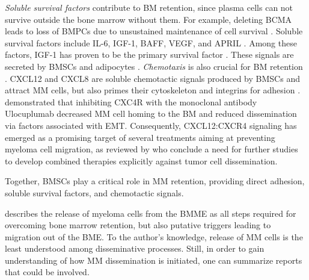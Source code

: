 \emph{Soluble survival factors} contribute to \ac{BM} retention, since plasma
cells can not survive outside the bone marrow without them. For example,
deleting BCMA  leads to loss of
\acp{BMPC}  due to unsustained maintenance of cell survival
\cite{oconnorBCMAEssentialSurvival2004}. Soluble survival factors include
\ac{IL-6}, \ac{IGF-1}, \ac{BAFF}, \ac{VEGF}, and \ac{APRIL} . Among these factors, IGF-1 has proven to be the primary
survival factor \cite{sprynskiRoleIGF1Major2009}. These signals are secreted by
\acp{BMSC} and adipocytes \cite{kiblerAdhesiveInteractionsHuman1998,
    garcia-ortizRoleTumorMicroenvironment2021}. \emph{Chemotaxis} is also crucial
for \ac{BM} retention \cite{ullahRoleCXCR4Multiple2019}. \ac{CXCL12}
 and CXCL8 are soluble chemotactic signals
produced by \acp{BMSC} and attract \ac{MM} cells, but also primes their
cytoskeleton and integrins for adhesion
\cite{aggarwalChemokinesMultipleMyeloma2006,
    alsayedMechanismsRegulationCXCR42007}.
\citet{roccaroCXCR4RegulatesExtraMedullary2015} demonstrated that inhibiting
CXC4R  with the monoclonal antibody
Ulocuplumab decreased \ac{MM} cell homing to the \ac{BM} and reduced
dissemination via factors associated with \ac{EMT}. Consequently, CXCL12:CXCR4
signaling has emerged as a promising target of several treatments aiming at
preventing myeloma cell migration, as reviewed by
\citet{itoRoleTherapeuticTargeting2021} who conclude a need for further studies
to develop combined therapies explicitly against tumor cell dissemination.

Together, \acp{BMSC} play a critical role in \ac{MM} retention, providing direct
adhesion, soluble survival factors, and chemotactic signals.


%
\label{sec:intro_myeloma_release}%
\citet{zeissigTumourDisseminationMultiple2020} describes the release of myeloma
cells from the \ac{BMME} as all steps required for overcoming bone marrow
retention, but also putative triggers leading to migration out of the BME. To
the author's knowledge, release of \ac{MM} cells is the least understood among
disseminative processes. Still, in order to gain understanding of how \ac{MM}
dissemination is initiated, one can summarize reports that could be involved.


